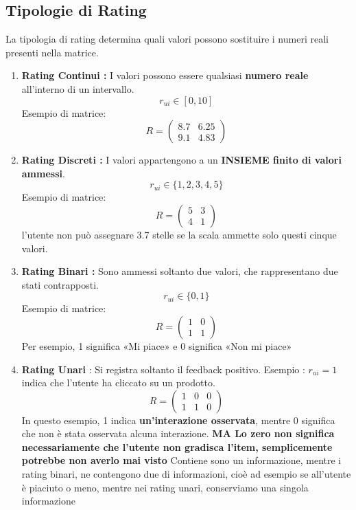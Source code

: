 \subsection{Tipologie di Rating}
La tipologia di rating determina quali valori possono sostituire i numeri reali presenti nella matrice.
\begin{enumerate}
    \item \textbf{Rating Continui : } I valori possono essere qualsiasi \textbf{numero reale} all'interno di un intervallo.
    \begin{equation}
        r_{ui} \in [0,10]
    \end{equation}
    Esempio di matrice:
    \[
        R = \begin{pmatrix}
        8.7 & 6.25  \\
        9.1 & 4.83
        \end{pmatrix}
    \]
    \item \textbf{Rating Discreti : } I valori appartengono a un \textbf{INSIEME finito di valori ammessi}.
    \begin{equation}
        r_{ui} \in \{1,2,3,4,5\}
    \end{equation}
    Esempio di matrice:
    \[
        R = \begin{pmatrix}
        5 & 3  \\
        4 & 1
        \end{pmatrix}
    \]
    l'utente non può assegnare 3.7 stelle se la scala ammette solo questi cinque valori.
    \item \textbf{Rating Binari : } Sono ammessi soltanto due valori, che rappresentano due stati contrapposti.
    \begin{equation}
        r_{ui} \in \{0,1\}
    \end{equation}
    Esempio di matrice:
    \[
        R = \begin{pmatrix}
        1 & 0  \\
        1 & 1
        \end{pmatrix}
    \]
    Per esempio, 1 significa «Mi piace» e 0 significa «Non mi piace»
    \item \textbf{Rating Unari} : Si registra soltanto il feedback positivo.
    Esempio :  $r_{ui} = 1$ indica che l'utente ha cliccato su un prodotto.
    \[
        R = \begin{pmatrix}
        1 & 0 & 0  \\
        1 & 1 & 0
        \end{pmatrix}
    \]
    In questo esempio, 1 indica \textbf{un'interazione osservata}, mentre 0 significa che non è stata osservata alcuna interazione.
    \textbf{MA Lo zero non significa necessariamente che l'utente non gradisca l'item, semplicemente potrebbe non averlo mai visto}
    Contiene sono un informazione, mentre i rating binari, ne contengono due di informazioni, cioè ad esempio se all'utente è piaciuto o meno, mentre nei rating unari, conserviamo
    una singola informazione
\end{enumerate}

